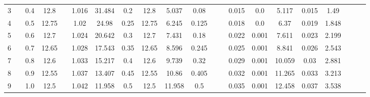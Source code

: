 \documentclass[a4paper,12pt]{article}
\begin{document}
\begin{table}[htp]
\begin{adjustwidth}{-3.5cm}{}
\begin{tabular}{|c|c|c|c|c|c|c|c|c|c|c|c|c|c|c|c|c|c|c|c|c|}
3     &                      & 0.4 & 12.8  &                       & 1.016 & 31.484  & 0.2  & 12.8  & 5.037  & 0.08  &                        &                         & 0.015     & 0.0       & 5.117  & 0.015  & 1.49       &                         &                         &                         \\ \cline{1-1} \cline{3-4} \cline{6-11} \cline{14-18}
4     &                      & 0.5 & 12.75 &                       & 1.02  & 24.98   & 0.25 & 12.75 & 6.245  & 0.125 &                        &                         & 0.018     & 0.0       & 6.37   & 0.019  & 1.848      &                         &                         &                         \\ \cline{1-1} \cline{3-4} \cline{6-11} \cline{14-18}
5     &                      & 0.6 & 12.7  &                       & 1.024 & 20.642  & 0.3  & 12.7  & 7.431  & 0.18  &                        &                         & 0.022     & 0.001     & 7.611  & 0.023  & 2.199      &                         &                         &                         \\ \cline{1-1} \cline{3-4} \cline{6-11} \cline{14-18}
6     &                      & 0.7 & 12.65 &                       & 1.028 & 17.543  & 0.35 & 12.65 & 8.596  & 0.245 &                        &                         & 0.025     & 0.001     & 8.841  & 0.026  & 2.543      &                         &                         &                         \\ \cline{1-1} \cline{3-4} \cline{6-11} \cline{14-18}
7     &                      & 0.8 & 12.6  &                       & 1.033 & 15.217  & 0.4  & 12.6  & 9.739  & 0.32  &                        &                         & 0.029     & 0.001     & 10.059 & 0.03   & 2.881      &                         &                         &                         \\ \cline{1-1} \cline{3-4} \cline{6-11} \cline{14-18}
8     &                      & 0.9 & 12.55 &                       & 1.037 & 13.407  & 0.45 & 12.55 & 10.86  & 0.405 &                        &                         & 0.032     & 0.001     & 11.265 & 0.033  & 3.213      &                         &                         &                         \\ \cline{1-1} \cline{3-4} \cline{6-11} \cline{14-18}
9     &                      & 1.0 & 12.5  &                       & 1.042 & 11.958  & 0.5  & 12.5  & 11.958 & 0.5   &                        &                         & 0.035     & 0.001     & 12.458 & 0.037  & 3.538      &                         &                         &                         \\ \cline{1-1} \cline{3-4} \cline{6-11} \cline{14-18}

\end{tabular}
\end{adjustwidth}
\end{table}
\end{document}
